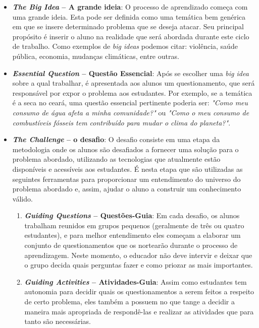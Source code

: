 \documentclass[
	12pt,				%
	openright,			%
	twoside,			%
	a4paper,			%
	english,			%
	french,				%
	spanish,			%
	brazil,				%
	]{abntex2}
\begin{document}
\begin{itemize}
\item \textbf{\textit{The Big Idea} -- A grande ideia}: O processo de aprendizado começa com uma grande ideia. Esta pode ser definida como uma temática bem genérica em que se insere determinado problema que se deseja atacar. Seu principal propósito é inserir o aluno na realidade que será abordada durante este ciclo de trabalho. Como exemplos de \textit{big ideas} podemos citar: violência, saúde pública, economia, mudanças climáticas, entre outras.

\item \textbf{\textit{Essential Question} -- Questão Essencial}: Após se escolher uma \textit{big idea} sobre a qual trabalhar, é apresentada aos alunos um questionamento, que será responsável por expor o problema aos estudantes. Por exemplo, se a temática é a seca no ceará, uma questão essencial pertinente poderia ser: \textit{"Como meu consumo de água afeta a minha comunidade?"} ou \textit{"Como o meu consumo de combustíveis fósseis tem contribuído para mudar o clima do planeta?"}.

\item \textbf{\textit{The Challenge} -- o desafio}: O desafio consiste em uma etapa da metodologia onde os alunos são desafiados a fornecer uma solução para o problema abordado, utilizando as tecnologias que atualmente estão disponíveis e acessíveis aos estudantes. É nesta etapa que são utilizadas as seguintes ferramentas para proporcionar um entendimento do universo do problema abordado e, assim, ajudar o aluno a construir um conhecimento válido.

\begin{enumerate}
\item \textbf{\textit{Guiding Questions} -- Questões-Guia}: Em cada desafio, os alunos trabalham reunidos em grupos pequenos (geralmente de três ou quatro estudantes), e para melhor entendimento eles começam a elaborar um conjunto de questionamentos que os nortearão durante o processo de aprendizagem. Neste momento, o educador não deve intervir e deixar que o grupo decida quais perguntas fazer e como priozar as mais importantes.

\item \textbf{\textit{Guiding Activities} -- Atividades-Guia}: Assim como estudantes tem autonomia para decidir quais os questionamentos a serem feitos a respeito de certo problema, eles também a possuem no que tange a decidir a maneira mais apropriada de respondê-las e realizar as atividades que para tanto são necessárias. 


\end{enumerate}
\end{itemize}
\end{document}
